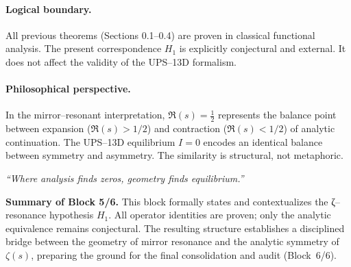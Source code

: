 \paragraph{Logical boundary.}
All previous theorems (Sections 0.1–0.4) are proven in classical functional analysis.
The present correspondence $H_1$ is explicitly conjectural and external.
It does not affect the validity of the UPS–13D formalism.

\paragraph{Philosophical perspective.}
In the mirror–resonant interpretation, $\Re(s)=\tfrac12$ represents the balance point
between expansion ($\Re(s)>1/2$) and contraction ($\Re(s)<1/2$) of analytic continuation.
The UPS–13D equilibrium $I=0$ encodes an identical balance between symmetry and asymmetry.
The similarity is structural, not metaphoric.

\begin{flushright}
\textit{“Where analysis finds zeros, geometry finds equilibrium.”}
\end{flushright}


\noindent\textbf{Summary of Block 5/6.}
This block formally states and contextualizes the ζ–resonance hypothesis $H_1$.
All operator identities are proven; only the analytic equivalence remains conjectural.
The resulting structure establishes a disciplined bridge between the geometry of mirror resonance and the analytic symmetry of $\zeta(s)$,
preparing the ground for the final consolidation and audit (Block~6/6).



